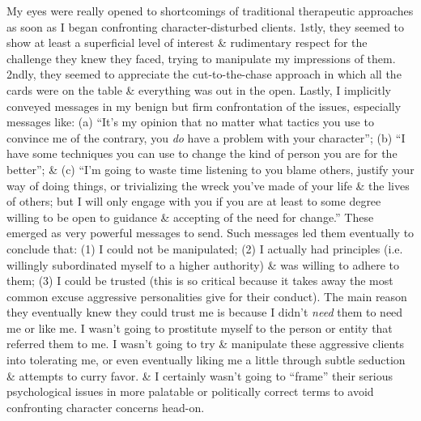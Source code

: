 \documentclass{article}
\numberwithin{equation}{section}
\begin{document}
\begin{itemize}
    My eyes were really opened to shortcomings of traditional therapeutic approaches as soon as I began confronting character-disturbed clients. 1stly, they seemed to show at least a superficial level of interest \& rudimentary respect for the challenge they knew they faced, trying to manipulate my impressions of them. 2ndly, they seemed to appreciate the cut-to-the-chase approach in which all the cards were on the table \& everything was out in the open. Lastly, I implicitly conveyed messages in my benign but firm confrontation of the issues, especially messages like: (a) ``It's my opinion that no matter what tactics you use to convince me of the contrary, you \textit{do} have a problem with your character''; (b) ``I have some techniques you can use to change the kind of person you are for the better''; \& (c) ``I'm going to waste time listening to you blame others, justify your way of doing things, or trivializing the wreck you've made of your life \& the lives of others; but I will only engage with you if you are at least to some degree willing to be open to guidance \& accepting of the need for change.'' These emerged as very powerful messages to send. Such messages led them eventually to conclude that: (1) I could not be manipulated; (2) I actually had principles (i.e. willingly subordinated myself to a higher authority) \& was willing to adhere to them; (3) I could be trusted (this is so critical because it takes away the most common excuse aggressive personalities give for their conduct). The main reason they eventually knew they could trust me is because I didn't \textit{need} them to need me or like me. I wasn't going to prostitute myself to the person or entity that referred them to me. I wasn't going to try \& manipulate these aggressive clients into tolerating me, or even eventually liking me a little through subtle seduction \& attempts to curry favor. \& I certainly wasn't going to ``frame'' their serious psychological issues in more palatable or politically correct terms to avoid confronting character concerns head-on.
    

\end{itemize}
\end{document}
